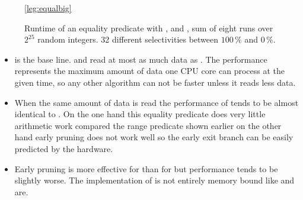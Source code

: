 \begin{figure}[h]
\begin{center}

\ref*{leg:equalbig}
\end{center}
\caption{Runtime of an equality predicate with \simdscan{}, \bwv{} and \bs{},
sum of eight runs over $2^{25}$ random integers. 32 different selectivities
between $100\,\%$ and $0\,\%$.}
\label{fig:eval:equalbig}
\end{figure}

\begin{itemize}
  \item \simdscan{} is the base line. \bwv{} and \bs{} read at most as much data
    as \simdscan{}. The performance represents the maximum amount of data one
    CPU core can process at the given time, so any other algorithm can not be
    faster unless it reads less data.
  \item When the same amount of data is read the performance of \bwv{} tends to
    be almost identical to \simdscan{}. On the one hand this equality predicate
    does very little arithmetic work compared the range predicate shown earlier
    on the other hand early pruning does not work well so the early exit branch
    can be easily predicted by the hardware.
  \item Early pruning is more effective for \bs{} than for \bwv{} but
    performance tends to be slightly worse. The implementation of \bs{} is not
    entirely memory bound like \simdscan{} and \bwv{} are.
\end{itemize}

